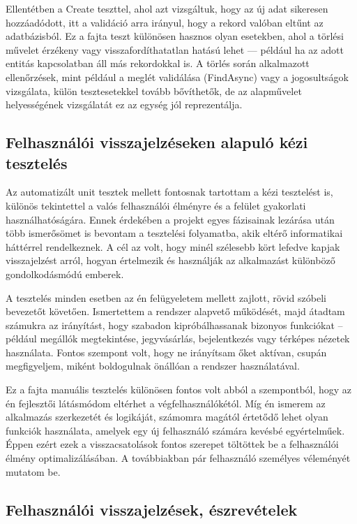 Ellentétben a Create teszttel, ahol azt vizsgáltuk, hogy az új adat sikeresen hozzáadódott, itt a validáció arra irányul, hogy a rekord valóban eltűnt az adatbázisból. Ez a fajta teszt különösen hasznos olyan esetekben, ahol a törlési művelet érzékeny vagy visszafordíthatatlan hatású lehet — például ha az adott entitás kapcsolatban áll más rekordokkal is. A törlés során alkalmazott ellenőrzések, mint például a meglét validálása (FindAsync) vagy a jogosultságok vizsgálata, külön tesztesetekkel tovább bővíthetők, de az alapművelet helyességének vizsgálatát ez az egység jól reprezentálja.

\subsection{Felhasználói visszajelzéseken alapuló kézi tesztelés}

Az automatizált unit tesztek mellett fontosnak tartottam a kézi tesztelést is, különös tekintettel a valós felhasználói élményre és a felület gyakorlati használhatóságára. Ennek érdekében a projekt egyes fázisainak lezárása után több ismerősömet is bevontam a tesztelési folyamatba, akik eltérő informatikai háttérrel rendelkeznek. A cél az volt, hogy minél szélesebb kört lefedve kapjak visszajelzést arról, hogyan értelmezik és használják az alkalmazást különböző gondolkodásmódú emberek.

A tesztelés minden esetben az én felügyeletem mellett zajlott, rövid szóbeli bevezetőt követően. Ismertettem a rendszer alapvető működését, majd átadtam számukra az irányítást, hogy szabadon kipróbálhassanak bizonyos funkciókat – például megállók megtekintése, jegyvásárlás, bejelentkezés vagy térképes nézetek használata. Fontos szempont volt, hogy ne irányítsam őket aktívan, csupán megfigyeljem, miként boldogulnak önállóan a rendszer használatával.

Ez a fajta manuális tesztelés különösen fontos volt abból a szempontból, hogy az én fejlesztői látásmódom eltérhet a végfelhasználókétól. Míg én ismerem az alkalmazás szerkezetét és logikáját, számomra magától értetődő lehet olyan funkciók használata, amelyek egy új felhasználó számára kevésbé egyértelműek. Éppen ezért ezek a visszacsatolások fontos szerepet töltöttek be a felhasználói élmény optimalizálásában. A továbbiakban pár felhasználó személyes véleményét mutatom be.

\subsection{Felhasználói visszajelzések, észrevételek}

